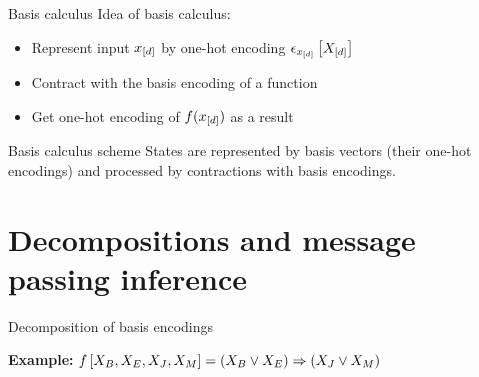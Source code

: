 \documentclass{beamer}
\begin{document}
    \begin{frame}{Basis calculus}
        Idea of basis calculus:
        \begin{itemize}
            \item Represent input $x_{[d]}$ by one-hot encoding $\epsilon_{x_{[d]}}\left[X_{[d]}\right]$
            \item Contract with the basis encoding of a function
            \item Get one-hot encoding of $f(x_{[d]})$ as a result
        \end{itemize}

        \begin{block}{Basis calculus scheme}
            States are represented by basis vectors (their one-hot encodings) and processed by contractions with basis encodings.
        \end{block}
    \end{frame}


    \section{Decompositions and message passing inference}


    \begin{frame}{Decomposition of basis encodings}

        {\bf Example:} $f\left[X_{B},X_{E},X_{J},X_{M}\right]
        = \left(X_{B} \lor X_{E}\right) \Rightarrow \left(X_{J} \lor X_{M}\right)$
        
    \end{frame}
\end{document}
